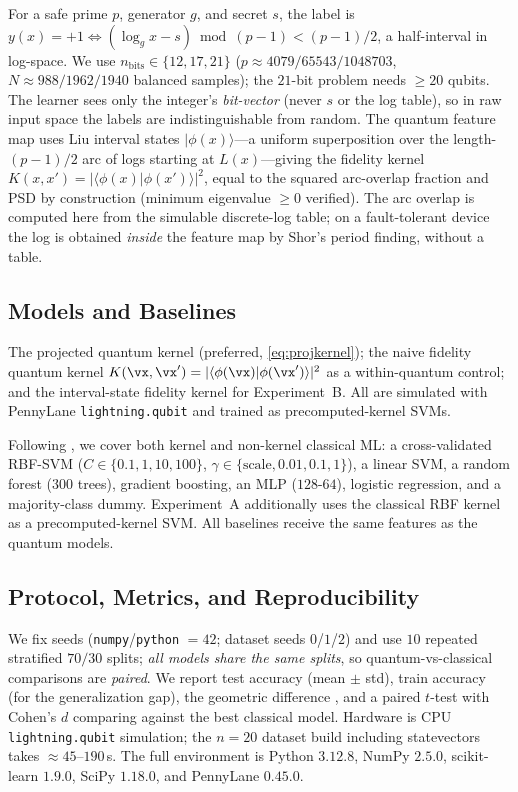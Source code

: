  For a safe prime
$p$, generator $g$, and secret $s$, the label is
$y(x)=+1 \Leftrightarrow (\log_g x - s)\bmod(p-1) < (p-1)/2$, a half-interval in
log-space. We use $n_\text{bits}\in\{12,17,21\}$ ($p\approx 4079/65543/1048703$,
$N\approx 988/1962/1940$ balanced samples); the $21$-bit problem needs $\ge 20$
qubits. The learner sees only the integer's \emph{bit-vector} (never $s$ or the
log table), so in raw input space the labels are indistinguishable from random.
The quantum feature map uses Liu interval states
$|\phi(x)\rangle$---a uniform superposition over the length-$(p-1)/2$ arc of logs
starting at $L(x)$---giving the fidelity kernel
$K(x,x')=|\langle\phi(x)|\phi(x')\rangle|^2$, equal to the squared arc-overlap
fraction and PSD by construction (minimum eigenvalue $\ge 0$ verified).
 The arc overlap is computed here from the simulable
discrete-log table; on a fault-tolerant device the log is obtained \emph{inside}
the feature map by Shor's period finding, without a table.

\subsection{Models and Baselines}
\label{sec:models}

 The projected quantum kernel \pqk{} (preferred,
\eqref{eq:projkernel}); the naive fidelity quantum kernel \fqk{}
$K(\vx,\vx')=|\langle\phi(\vx)|\phi(\vx')\rangle|^2$ as a within-quantum control;
and the interval-state fidelity kernel \isk{} for Experiment~B. All are simulated
with PennyLane \texttt{lightning.qubit} and trained as precomputed-kernel SVMs.

 Following \citet{huang2021power}, we cover both kernel
and non-kernel classical ML: a cross-validated RBF-SVM
($C\in\{0.1,1,10,100\}$, $\gamma\in\{\text{scale},0.01,0.1,1\}$), a linear SVM, a
random forest ($300$ trees), gradient boosting, an MLP ($128$-$64$), logistic
regression, and a majority-class dummy. Experiment~A additionally uses the
classical RBF kernel as a precomputed-kernel SVM. All baselines receive the same
features as the quantum models.

\subsection{Protocol, Metrics, and Reproducibility}
\label{sec:protocol}

We fix seeds (\texttt{numpy}/\texttt{python} $=42$; dataset seeds $0$/$1$/$2$) and
use $10$ repeated stratified $70/30$ splits; \emph{all models share the same
splits}, so quantum-vs-classical comparisons are \emph{paired}. We report test
accuracy (mean $\pm$ std), train accuracy (for the generalization gap), the
geometric difference \gdiff{}, and a paired $t$-test with Cohen's $d$ comparing
\pqk{} against the best classical model. Hardware is CPU \texttt{lightning.qubit}
simulation; the $n=20$ dataset build including statevectors takes $\approx
45$--$190$\,s. The full environment is Python $3.12.8$, NumPy $2.5.0$,
scikit-learn $1.9.0$, SciPy $1.18.0$, and PennyLane $0.45.0$.
